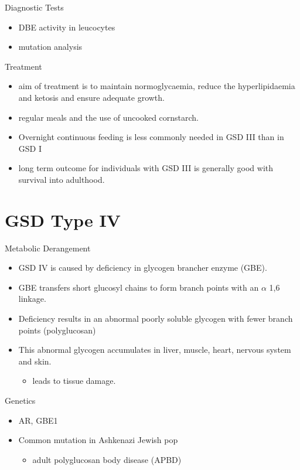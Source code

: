 \documentclass[presentation, smaller]{beamer}
\begin{document}
\begin{frame}[label={sec:org1f82939}]{Diagnostic Tests}
\begin{itemize}
\item DBE activity in leucocytes
\item mutation analysis
\end{itemize}
\end{frame}
\begin{frame}[label={sec:org5b6cd36}]{Treatment}
\begin{itemize}
\item aim of treatment is to maintain normoglycaemia, reduce the
hyperlipidaemia and ketosis and ensure adequate growth.
\item regular meals and the use of uncooked cornstarch.
\item Overnight continuous feeding is less commonly needed in GSD III than
in GSD I
\item long term outcome for individuals with GSD III is generally good
with survival into adulthood.
\end{itemize}
\end{frame}
\section{GSD Type IV}
\label{sec:org653b8f5}
\begin{frame}[label={sec:org78f2b37}]{Metabolic Derangement}
\begin{itemize}
\item GSD IV is caused by deficiency in glycogen brancher enzyme (GBE).
\item GBE transfers short glucosyl chains to form branch points with an
\(\alpha\) 1,6 linkage.
\item Deficiency results in an abnormal poorly soluble glycogen with fewer branch points (polyglucosan)
\item This abnormal glycogen accumulates in liver, muscle, heart, nervous system and skin.
\begin{itemize}
\item leads to tissue damage.
\end{itemize}
\end{itemize}
\end{frame}

\begin{frame}[label={sec:orge4a746a}]{Genetics}
\begin{itemize}
\item AR, GBE1
\item Common mutation in Ashkenazi Jewish pop
\begin{itemize}
\item adult polyglucosan body disease (APBD)
\end{itemize}
\end{itemize}
\end{frame}
\end{document}
